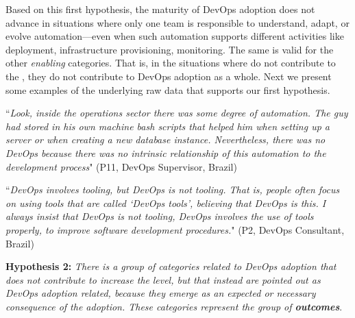 Based on this first hypothesis, the maturity of DevOps adoption does not
advance in situations where only one team is responsible to understand, adapt, or
evolve automation---even when such automation supports different activities like deployment, infrastructure provisioning,
monitoring. The same is valid for the other \emph{enabling} categories. That is, in the situations where
 do not contribute to
the \cc, they do not contribute to DevOps adoption as a whole. Next
we present some examples of the underlying raw data that supports our first hypothesis.

\begin{mq}
``\emph{Look, inside the operations sector there was some degree of automation. The guy
had stored in his own machine bash scripts that helped him when setting up a
server or when creating a new database instance. Nevertheless, there was no DevOps
because there was no intrinsic relationship of this automation to the
development process}" (P11, DevOps Supervisor, Brazil)
\end{mq}


\begin{mq}
``\emph{DevOps involves tooling, but DevOps is not tooling. That is, people often
focus on using tools that are called `DevOps tools', believing that DevOps is
this. I always insist that DevOps is not tooling, DevOps involves the use of
tools properly, to improve software development procedures.}" (P2, DevOps
Consultant, Brazil)
\end{mq}



\begin{mh}
\textbf{Hypothesis 2:} \textit{There is a group of categories related to DevOps adoption
that does not contribute to increase the} \cc \emph{level, but that instead are
pointed out as DevOps adoption related, because they emerge as an expected or
necessary consequence of the adoption. These categories represent the group of
\textbf{outcomes}}.
\end{mh}


